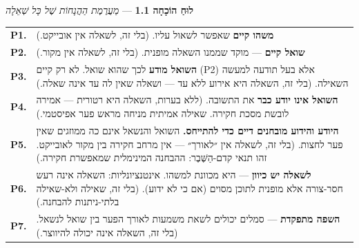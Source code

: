\documentclass[10pt, openany, oneside]{book}
\renewcommand{\footnotesize}{\fontsize{8.5}{11}\selectfont}
\begin{document}
\vspace{0.8em}

\textbf{לוּחַ הוֹכָחָה 1.1} --- \textit{מַעֲרֶמֶת הַהֲנָחוֹת שֶׁל כָּל שְׁאֵלָה}

\vspace{0.5em}

{\footnotesize
\noindent\begin{tabular}{r p{}}
\textbf{P1.} & \textbf{משהו קיים} שאפשר לשאול עליו. (בלי זה, לשאלה אין אובייקט.) \\[0.3em]
\textbf{P2.} & \textbf{שואל קיים} — מוקד שממנו השאלה מופנית. (בלי זה, לשאלה אין מקור.) \\[0.3em]
\textbf{P3.} & \textbf{השואל מודע} לכך שהוא שואל. לא רק קיים (P2) אלא בעל תודעה למעשה השאילה. (בלי זה, השאלה היא אירוע ללא עד — ושאלה שאין לה עד אינה שאלה.) \\[0.3em]
\textbf{P4.} & \textbf{השואל אינו יודע כבר} את התשובה. (ללא בערות, השאלה היא רטורית — אמירה לובשת מסכת חקירה. שאילה אמיתית מניחה מראש פער אפיסטמי.) \\[0.3em]
\textbf{P5.} & \textbf{היודע והידוע מובחנים דיים כדי להתייחס.} השואל והנשאל אינם כה ממוזגים שאין פער לחצות. (בלי זה, לשאלה אין ״לאורך״ — אין מרחב חקירה בין מקור לאובייקט. זהו תנאי קדם-הַשֶּׁבֶר: ההבחנה המינימלית שמאפשרת חקירה.) \\[0.3em]
\textbf{P6.} & \textbf{לשאלה יש כיוון} — היא מכוונת למשהו. אינטנציונליות: השאלה אינה רעש חסר-צורה אלא מופנית לתוכן מסוים (אם כי לא ידוע). (בלי זה, שאילה ולא-שאילה בלתי-ניתנות להבחנה.) \\[0.3em]
\textbf{P7.} & \textbf{השפה מתפקדת} — סמלים יכולים לשאת משמעות לאורך הפער בין שואל לנשאל. (בלי זה, השאלה אינה יכולה להיווצר.) \\[0.3em]
\end{tabular}
}
\end{document}
